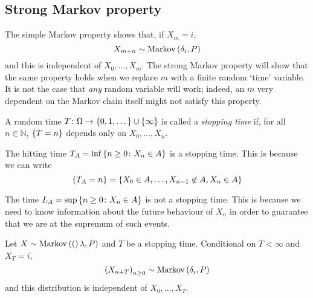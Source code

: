 \subsection{Strong Markov property}
The simple Markov property shows that, if \( X_m = i \),
\[
	X_{m + n} \sim \operatorname{Markov}\left({\delta_i, P}\right)
\]
and this is independent of \( X_0, \dots, X_m \).
The strong Markov property will show that the same property holds when we replace \( m \) with a finite random `time' variable.
It is not the case that \textit{any} random variable will work; indeed, an \( m \) very dependent on the Markov chain itself might not satisfy this property.
\begin{definition}
	A random time \( T \colon \Omega \to \qty{0, 1, \dots} \cup \qty{\infty} \) is called a \textit{stopping time} if, for all \( n \in \mathbb N \), \( \qty{ T = n } \) depends only on \( X_0, \dots, X_n \).
\end{definition}
\begin{example}
	The hitting time \( T_A = \inf \qty{ n \geq 0 \colon X_n \in A} \) is a stopping time.
	This is because we can write
	\[
		\qty{T_A = n} = \qty{X_0 \in A, \dots, X_{n-1} \not\in A, X_n \in A}
	\]
\end{example}
\begin{example}
	The time \( L_A = \sup \qty{n \geq 0 \colon X_n \in A} \) is not a stopping time.
	This is because we need to know information about the future behaviour of \( X_n \) in order to guarantee that we are at the supremum of such events.
\end{example}
\begin{theorem}
	Let \( X \sim \operatorname{Markov}\left({(}\right)\lambda, P) \) and \( T \) be a stopping time.
	Conditional on \( T < \infty \) and \( X_T = i \),
	\[
		\qty(X_{n + T})_{n \geq 0} \sim \operatorname{Markov}\left({\delta_i, P}\right)
	\]
	and this distribution is independent of \( X_0, \dots, X_T \).
\end{theorem}
